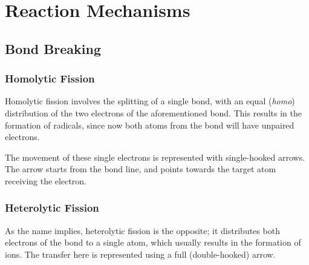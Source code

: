 

\pagebreak
\section{Reaction Mechanisms}

\subsection{Bond Breaking}
	\subsubsection{Homolytic Fission}

		Homolytic fission involves the splitting of a single bond, with an equal (\textit{homo}) distribution of the two electrons
		of the aforementioned bond. This results in the formation of radicals, since now both atoms from the bond will have
		unpaired electrons.

		The movement of these single electrons is represented with single-hooked arrows. The arrow starts from the bond line, and points
		towards the target atom receiving the electron.



	\subsubsection{Heterolytic Fission}

		As the name implies, heterolytic fission is the opposite; it distributes both electrons of the bond to a single atom, which
		usually results in the formation of ions. The transfer here is represented using a full (double-hooked) arrow.


